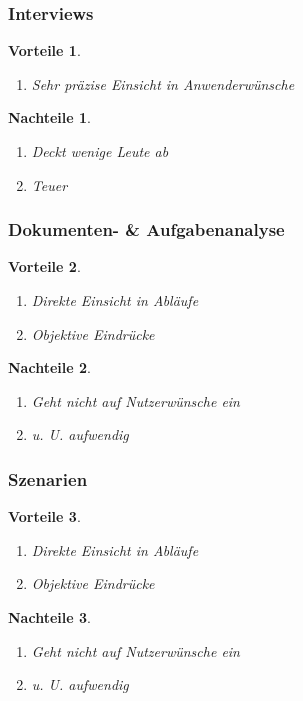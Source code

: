 \documentclass[a4paper]{article}
\theoremstyle{break}
\newtheorem{why}{Vorteile}[section]
\newtheorem{whynot}{Nachteile}[section]
\begin{document}
\subsubsection{Interviews}
	\begin{why}
		\begin{enumerate}
			\item Sehr präzise Einsicht in Anwenderwünsche
		\end{enumerate}
	\end{why}
	\begin{whynot}
		\begin{enumerate}
			\item Deckt wenige Leute ab
			\item Teuer
			\end{enumerate}
	\end{whynot}
\subsubsection{Dokumenten- \& Aufgabenanalyse}
	\begin{why}
		\begin{enumerate}
			\item Direkte Einsicht in Abläufe
			\item Objektive Eindrücke
		\end{enumerate}
	\end{why}
	\begin{whynot}
		\begin{enumerate}
			\item Geht nicht auf Nutzerwünsche ein
			\item u. U. aufwendig
		\end{enumerate}
	\end{whynot}	
\subsubsection{Szenarien}
	\begin{why}
		\begin{enumerate}
			\item Direkte Einsicht in Abläufe
			\item Objektive Eindrücke
		\end{enumerate}
	\end{why}
	\begin{whynot}
		\begin{enumerate}
			\item Geht nicht auf Nutzerwünsche ein
			\item u. U. aufwendig
		\end{enumerate}
	\end{whynot}
\end{document}
